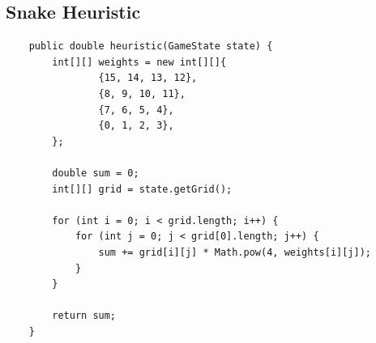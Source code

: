 \documentclass{article}
\begin{document}
\subsection{Snake Heuristic}
\label{apendix:ogsnake}
\begin{verbatim}
    public double heuristic(GameState state) {
        int[][] weights = new int[][]{
                {15, 14, 13, 12}, 
                {8, 9, 10, 11}, 
                {7, 6, 5, 4},
                {0, 1, 2, 3},
        };

        double sum = 0;
        int[][] grid = state.getGrid();

        for (int i = 0; i < grid.length; i++) {
            for (int j = 0; j < grid[0].length; j++) {
                sum += grid[i][j] * Math.pow(4, weights[i][j]);
            }
        }

        return sum;
    }
\end{verbatim}
\end{document}
